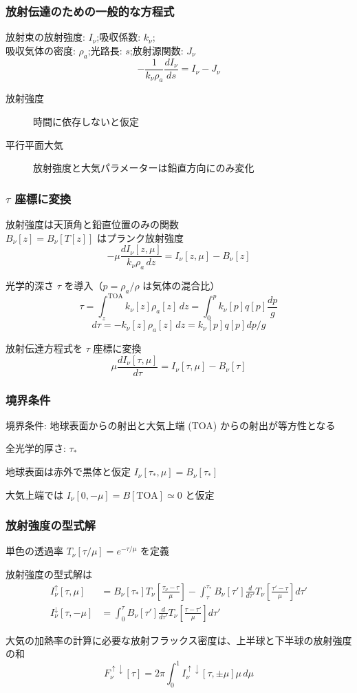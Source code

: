 \documentclass[unicode,colorlinks]{beamer}
\begin{document}
\begin{frame}
	\frametitle{放射伝達のための一般的な方程式}
	放射束の放射強度: $I_\nu$;\quad 吸収係数: $k_\nu$;\\
	吸収気体の密度: $\rho_a$;\quad 光路長: $s$;\quad 放射源関数: $J_\nu$
	\[-\frac{1}{k_\nu \rho_a}\frac{dI_\nu}{ds}=I_\nu-J_\nu\]

	\begin{description}
		\item[放射強度] 時間に依存しないと仮定
		\item[平行平面大気] 放射強度と大気パラメーターは鉛直方向にのみ変化
	\end{description}
\end{frame}

\begin{frame}
	\frametitle{$\tau$ 座標に変換}
	放射強度は天頂角と鉛直位置のみの関数\\
	$B_\nu[z]=B_\nu[T[z]]$ はプランク放射強度
	\[-\mu\frac{dI_\nu[z,\mu]}{k_\nu\rho_a\,dz}=I_\nu[z,\mu]-B_\nu[z]\]

	光学的深さ $\tau$ を導入（$p=\rho_a/\rho$ は気体の混合比）
	\[\tau=\int^{\mathrm{TOA}}_{z} k_\nu[z]\rho_a[z]\,dz=\int^p_0 k_\nu[p]q[p]\frac{dp}{g}\]
	\[d\tau=-k_\nu[z]\rho_a[z]\,dz=k_\nu[p]q[p]dp/g\]

	放射伝達方程式を $\tau$ 座標に変換
	\[\mu\frac{dI_\nu[\tau,\mu]}{d\tau}=I_\nu[\tau,\mu]-B_\nu[\tau]\]
\end{frame}

\begin{frame}
	\frametitle{境界条件}
	境界条件: 地球表面からの射出と大気上端 (TOA) からの射出が等方性となる

	全光学的厚さ: $\tau_*$

	地球表面は赤外で黒体と仮定 $I_\nu[\tau_*,\mu]=B_\nu[\tau_*]$

	大気上端では $I_\nu[0,-\mu]=B[\mathrm{TOA}]\simeq0$ と仮定
\end{frame}

\begin{frame}
	\frametitle{放射強度の型式解}
	単色の透過率 $T_\nu[\tau/\mu]=e^{-\tau/\mu}$ を定義

	放射強度の型式解は
	\begin{align*}
		I^\uparrow_\nu[\tau,\mu]
			&=B_\nu[\tau_*]T_\nu\left[\frac{\tau_\nu-\tau}{\mu}\right]
			-\int^{\tau_*}_\tau B_\nu[\tau']\frac{d}{d\tau'}T_\nu\left[\frac{\tau'-\tau}{\mu}\right]d\tau'\\
		I^\downarrow_\nu[\tau,-\mu]
			&=\int^\tau_0 B_\nu[\tau']\frac{d}{d\tau'}T_\nu\left[\frac{\tau-\tau'}{\mu}\right]d\tau'
	\end{align*}

	大気の加熱率の計算に必要な放射フラックス密度は、上半球と下半球の放射強度の和
	\[F^{\uparrow\downarrow}_\nu[\tau]=2\pi\int^1_0 I^{\uparrow\downarrow}_\nu[\tau,\pm\mu]\mu\,d\mu\]
\end{frame}
\end{document}
